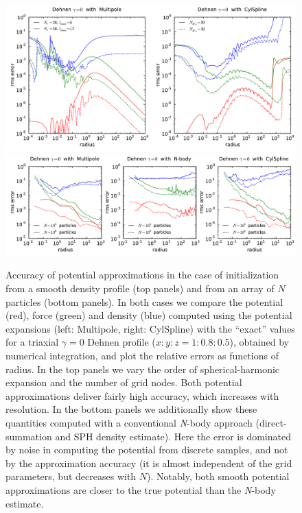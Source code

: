 \documentclass[12pt]{article}
\newcommand{\Nbody}{\textsl{N}-body\xspace}
\begin{document}
\begin{figure}
\includegraphics[width=16cm]{D0.pdf}
\includegraphics[width=16cm]{D0nb.pdf}
\caption{Accuracy of potential approximations in the case of initialization from a smooth density profile (top panels) and from an array of $N$ particles (bottom panels). In both cases we compare the potential (red), force (green) and density (blue) computed using the potential expansions (left: Multipole, right: CylSpline) with the ``exact'' values for a triaxial $\gamma=0$ Dehnen profile ($x:y:z=1:0.8:0.5$), obtained by numerical integration, and plot the relative errors as functions of radius. In the top panels we vary the order of spherical-harmonic expansion and the number of grid nodes. Both potential approximations deliver fairly high accuracy, which increases with resolution. In the bottom panels we additionally show these quantities computed with a conventional \Nbody approach (direct-summation and SPH density estimate). Here the error is dominated by noise in computing the potential from discrete samples, and not by the approximation accuracy (it is almost independent of the grid parameters, but decreases with $N$). Notably, both smooth potential approximations are closer to the true potential than the \Nbody estimate.
}  \label{fig:PotentialAccuracy1}
\end{figure}
\end{document}
